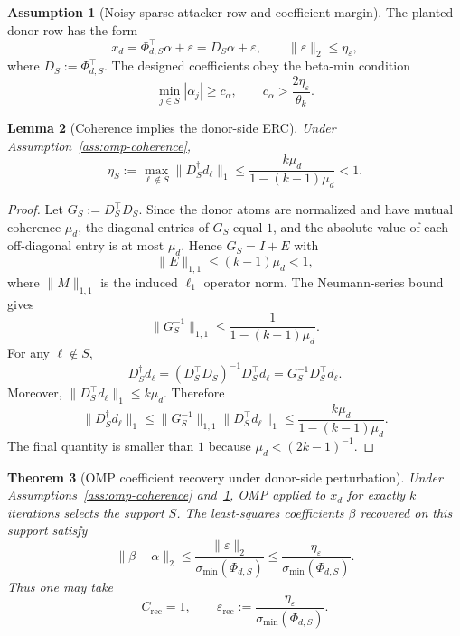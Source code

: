 \documentclass{article}
\theoremstyle{plain}
\newtheorem{theorem}{Theorem}[section]
\newtheorem{lemma}[theorem]{Lemma}
\theoremstyle{definition}
\newtheorem{assumption}[theorem]{Assumption}
\theoremstyle{remark}
\begin{document}
\begin{assumption}[Noisy sparse attacker row and coefficient margin]
\label{ass:omp-noisy-row}
The planted donor row has the form
\[
x_d = \Phi_{d,S}^\top \alpha + \varepsilon = D_S\alpha+\varepsilon,
\qquad
\|\varepsilon\|_2 \le \eta_\varepsilon,
\]
where $D_S:=\Phi_{d,S}^\top$. The designed coefficients obey the beta-min condition
\[
\min_{j\in S}|\alpha_j| \ge c_\alpha,
\qquad
c_\alpha > \frac{2\eta_\varepsilon}{\theta_k}.
\]
\end{assumption}

\begin{lemma}[Coherence implies the donor-side ERC]
\label{lem:coherence-erc}
Under Assumption~\ref{ass:omp-coherence},
\[
\eta_S := \max_{\ell\notin S} \|D_S^\dagger d_\ell\|_1
\le
\frac{k\mu_d}{1-(k-1)\mu_d}
< 1.
\]
\end{lemma}

\begin{proof}
Let $G_S:=D_S^\top D_S$. Since the donor atoms are normalized and have mutual coherence $\mu_d$, the diagonal entries of $G_S$ equal $1$, and the absolute value of each off-diagonal entry is at most $\mu_d$. Hence $G_S=I+E$ with
\[
\|E\|_{1,1}\le (k-1)\mu_d < 1,
\]
where $\|M\|_{1,1}$ is the induced $\ell_1$ operator norm. The Neumann-series bound gives
\[
\|G_S^{-1}\|_{1,1}
\le
\frac{1}{1-(k-1)\mu_d}.
\]
For any $\ell\notin S$,
\[
D_S^\dagger d_\ell=(D_S^\top D_S)^{-1}D_S^\top d_\ell=G_S^{-1}D_S^\top d_\ell.
\]
Moreover, $\|D_S^\top d_\ell\|_1 \le k\mu_d$. Therefore
\[
\|D_S^\dagger d_\ell\|_1
\le
\|G_S^{-1}\|_{1,1}\|D_S^\top d_\ell\|_1
\le
\frac{k\mu_d}{1-(k-1)\mu_d}.
\]
The final quantity is smaller than $1$ because $\mu_d < (2k-1)^{-1}$.
\end{proof}

\begin{theorem}[OMP coefficient recovery under donor-side perturbation]
\label{thm:omp-coefficient-recovery}
Under Assumptions~\ref{ass:omp-coherence} and~\ref{ass:omp-noisy-row}, OMP applied to $x_d$ for exactly $k$ iterations selects the support $S$. The least-squares coefficients $\beta$ recovered on this support satisfy
\[
\|\beta-\alpha\|_2
\le
\frac{\|\varepsilon\|_2}{\sigma_{\min}(\Phi_{d,S})}
\le
\frac{\eta_\varepsilon}{\sigma_{\min}(\Phi_{d,S})}.
\]
Thus one may take
\[
C_{\mathrm{rec}}=1,
\qquad
\varepsilon_{\mathrm{rec}}
:=
\frac{\eta_\varepsilon}{\sigma_{\min}(\Phi_{d,S})}.
\]
\end{theorem}
\end{document}
